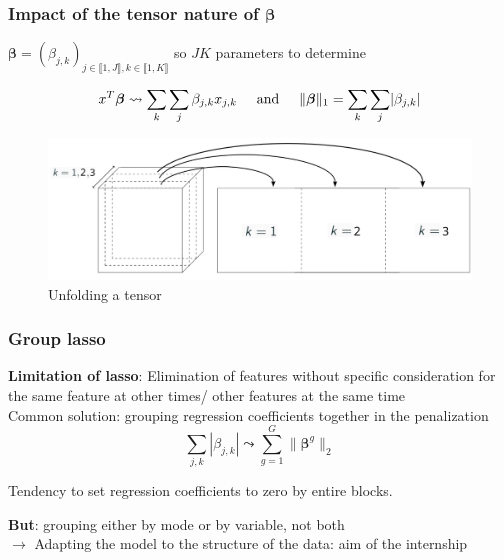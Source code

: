 \documentclass{beamer}
\begin{document}
\begin{frame}
    \frametitle{Impact of the tensor nature of $\bm{\beta}$}
    \begin{center}
    $\bm{\beta} = (\beta_{j,k})_{j \in \llbracket 1, J\rrbracket, k \in \llbracket 1, K\rrbracket}$ so $JK$ parameters to determine\\[15 pt]
    \end{center}
    $$x^T \bm{\beta} \leadsto \sum\limits_{k}\sum\limits_{j}  \beta_{j,k} x_{j,k} \hspace{0.5 cm} \text{and} \hspace{0.5 cm} \lVert \bm{\beta} \rVert_1 = \sum\limits_{k}\sum\limits_{j} \lvert \beta_{j,k} \rvert$$
    \begin{figure}
        \centering
        \includegraphics[scale = 0.2]{images/deplier.png}
        \caption{Unfolding a tensor}
    \end{figure}

    
\end{frame}

\begin{frame}
    \frametitle{Group lasso}
 \textbf{Limitation of lasso}: Elimination of features without specific consideration for the same feature at other times/ other features at the same time\\[10 pt]

 Common solution: grouping regression coefficients together in the penalization
 $$ \sum\limits_{j,k} |\beta_{j,k}|\leadsto \sum\limits_{g = 1}^G \lVert \bm{\beta}^g \rVert_2 $$

 Tendency to set regression coefficients to zero by entire blocks.

\textbf{But}: grouping either by mode or by variable, not both\\  $\rightarrow$ Adapting the model to the structure of the data: aim of the internship
    

\end{frame}
\end{document}
